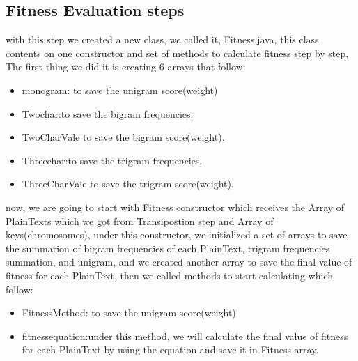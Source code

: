 \subsection{Fitness Evaluation steps}
with this step we created a new class, we called it, Fitness.java, this class contents on one constructor and set of methods to calculate fitness step by step, The first thing we did it is creating 6 arrays that follow:
\begin{itemize}
    \item{\textsf{monogram:} to save the unigram score(weight)}
    \item{\textsf{Twochar:}to save the bigram frequencies.}
    \item{\textsf{TwoCharVale} to save the bigram score(weight).}
    \item{\textsf{Threechar:}to save the trigram frequencies.}
    \item{\textsf{ThreeCharVale} to save the trigram score(weight).}
\end{itemize}
now, we are going to start with Fitness constructor which receives the Array of PlainTexts which we got  from Transipostion step and Array of keys(chromosomes), under this constructor, we initialized a set of arrays to save the summation of bigram frequencies of each PlainText, trigram frequencies summation, and unigram, and we created another array to save the final value of fitness for each PlainText, then we called methods to start calculating which follow:
\begin{itemize}
    \item{\textsf{FitnessMethod:} to save the unigram score(weight)}
    \item{\textsf{fitnessequation:}under this method, we will calculate the final value of fitness for each PlainText by using the equation and save it in Fitness array.}
\end{itemize}


